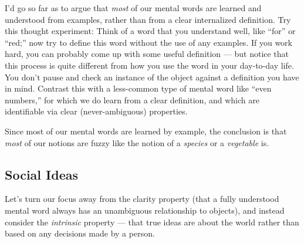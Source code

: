 \documentclass[11pt, oneside]{article}   	%
\begin{document}
I'd go so far as to argue that {\em most} of our mental words are learned and
understood from examples, rather than from a clear internalized definition.
Try this thought experiment: Think of a word that you understand well, like
``for'' or ``red;'' now try to define this word without the use of any examples.
If you work hard, you can probably come up with some useful definition --- but
notice that this process is quite different from how you use the word in your
day-to-day life. You don't pause and check an instance of the object against a
definition you have in mind. Contrast this with a less-common type of mental
word
like ``even numbers,'' for which we do learn from a clear definition,
and which are identifiable via clear (never-ambiguous) properties.

Since most of our mental words are learned by example, the conclusion is that
{\em most} of our notions are fuzzy like the notion of a {\em species} or a
{\em vegetable} is.


\subsection{Social Ideas}

%
%

Let's turn our focus away from the clarity property (that a fully understood
mental word always has an unambiguous relationship to objects), and instead
consider the {\em intrinsic} property --- that true ideas are about the world
rather
than based on any decisions made by a person.

\end{document}
